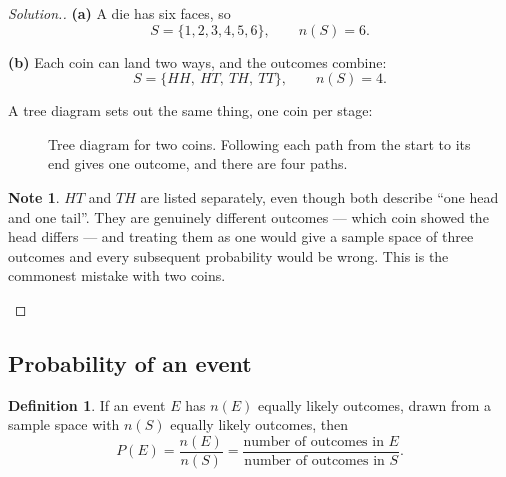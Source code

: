 \documentclass[11pt,a4paper]{article}
\theoremstyle{definition}
\newtheorem{definition}[thm]{Definition}
\newtheorem{note}[thm]{Note}
\newenvironment{solution}
  {\renewcommand{\qedsymbol}{}\begin{proof}[\textit{Solution}.]}
  {\end{proof}}
\begin{document}
\begin{solution}
\textbf{(a)} A die has six faces, so
$$S=\{1,2,3,4,5,6\},\qquad n(S)=6.$$

\textbf{(b)} Each coin can land two ways, and the outcomes combine:
$$S=\{HH,\ HT,\ TH,\ TT\},\qquad n(S)=4.$$

A tree diagram sets out the same thing, one coin per stage:

\begin{figure}[H]
\centering
{}
\caption{Tree diagram for two coins. Following each path from the start to its end gives one outcome, and there are four paths.}
\end{figure}

\begin{note}
$HT$ and $TH$ are listed separately, even though both describe ``one head and one
tail''. They are genuinely different outcomes --- which coin showed the head differs ---
and treating them as one would give a sample space of three outcomes and every
subsequent probability would be wrong. This is the commonest mistake with two coins.
\end{note}
\end{solution}

\subsection{Probability of an event}

\begin{definition}
If an event $E$ has $n(E)$ equally likely outcomes, drawn from a sample space with
$n(S)$ equally likely outcomes, then
$$P(E)=\frac{n(E)}{n(S)}=\frac{\text{number of outcomes in } E}
{\text{number of outcomes in } S}.$$
\end{definition}
\end{document}
